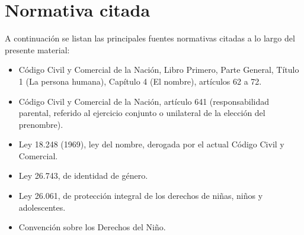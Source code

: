 \documentclass[12pt,oneside]{book}
\begin{document}
\chapter*{Normativa citada}

A continuación se listan las principales fuentes normativas citadas a lo largo del presente material:

\begin{itemize}
\item Código Civil y Comercial de la Nación, Libro Primero, Parte General, Título 1 (La persona humana), Capítulo 4 (El nombre), artículos 62 a 72.
\item Código Civil y Comercial de la Nación, artículo 641 (responsabilidad parental, referido al ejercicio conjunto o unilateral de la elección del prenombre).
\item Ley 18.248 (1969), ley del nombre, derogada por el actual Código Civil y Comercial.
\item Ley 26.743, de identidad de género.
\item Ley 26.061, de protección integral de los derechos de niñas, niños y adolescentes.
\item Convención sobre los Derechos del Niño.
\end{itemize}
\end{document}
